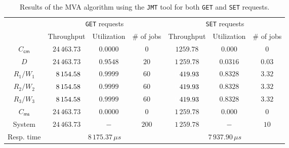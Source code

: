 \documentclass[11pt]{article}
\theoremstyle{definition}
\renewcommand\t\texttt
\newcommand\wh[1]{{\color[HTML]{FFFFFF}#1}}
\begin{document}
\begin{table}[h!]
    \centering
    \small
    {
        \begin{tabular}{|c||c|c|c||c|c|c|}
            \hline
            \rowcolor{Gray} & \multicolumn{3}{c||}{\t{GET} requests} & \multicolumn{3}{c|}{\t{SET} requests} \\
            \hhline{|~|-|-|-||-|-|-|}
            \rowcolor{Gray} \multirow{-2}{*}{Device} & Throughput & Utilization & \# of jobs & Throughput & Utilization & \# of jobs \\
            \hline
            \cellcolor{Gray} $C_{\textsf{cm}}$ & $24\,463.73$ & $0.0000$ & $0$ & $1259.78$ & $0.000$ & $0$ \\
            \cellcolor{Gray} $D$ & $24\,463.73$ & $0.9548$ & $20$ & $1\,259.78$ & $0.0316$ & $0.03$ \\
            \cellcolor{Gray} $R_1/W_1$ & $\wh08\,154.58$ & $0.9999$ & $60$ & $\wh0\,419.93$ & $0.8328$ & $3.32$ \\
            \cellcolor{Gray} $R_2/W_2$ & $\wh08\,154.58$ & $0.9999$ & $60$ & $\wh0\,419.93$ & $0.8328$ & $3.32$ \\
            \cellcolor{Gray} $R_3/W_3$ & $\wh08\,154.58$ & $0.9999$ & $60$ & $\wh0\,419.93$ & $0.8328$ & $3.32$ \\
            \cellcolor{Gray} $C_{\textsf{ms}}$ & $24\,463.73$ & $0.0000$ & $0$ & $1\,259.78$ & $0.000$ & $0$ \\
            \hline
            \cellcolor{Gray} System & $24\,463.73$ & $-$ & $200$ & $1\,259.78$ & $-$ & $10$ \\
            \hline
            \hline
            \cellcolor{Gray} Resp. time & \multicolumn{3}{c||}{$8\,175.37\,\mu s$} & \multicolumn{3}{c|}{$7\,937.90\,\mu s$} \\
            \hline
        \end{tabular}
    }
    \caption{Results of the MVA algorithm using the \t{JMT} tool for both \t{GET} and \t{SET} requests.}
    \label{tab:3_mva}
\end{table}
\end{document}

